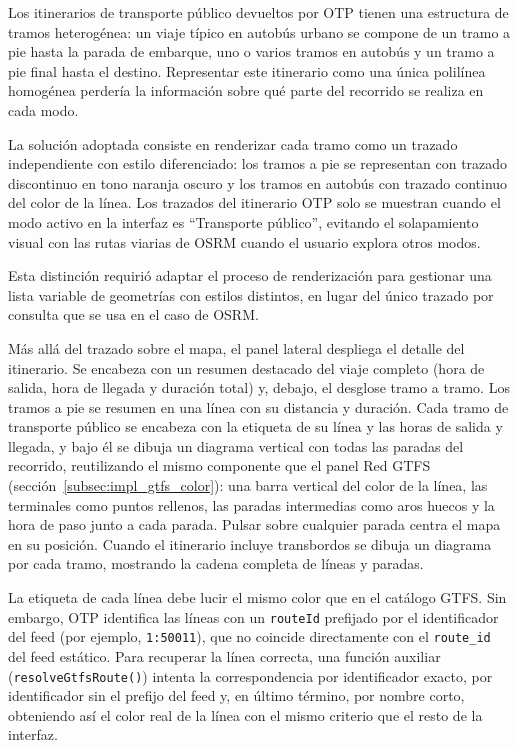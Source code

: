 Los itinerarios de transporte público devueltos por OTP tienen una estructura de tramos heterogénea: un viaje típico en autobús urbano se compone de un tramo a pie hasta la parada de embarque, uno o varios tramos en autobús y un tramo a pie final hasta el destino. Representar este itinerario como una única polilínea homogénea perdería la información sobre qué parte del recorrido se realiza en cada modo.

La solución adoptada consiste en renderizar cada tramo como un trazado independiente con estilo diferenciado: los tramos a pie se representan con trazado discontinuo en tono naranja oscuro y los tramos en autobús con trazado continuo del color de la línea. Los trazados del itinerario OTP solo se muestran cuando el modo activo en la interfaz es ``Transporte público'', evitando el solapamiento visual con las rutas viarias de OSRM cuando el usuario explora otros modos.

Esta distinción requirió adaptar el proceso de renderización para gestionar una lista variable de geometrías con estilos distintos, en lugar del único trazado por consulta que se usa en el caso de OSRM.

Más allá del trazado sobre el mapa, el panel lateral despliega el detalle del itinerario. Se encabeza con un resumen destacado del viaje completo (hora de salida, hora de llegada y duración total) y, debajo, el desglose tramo a tramo. Los tramos a pie se resumen en una línea con su distancia y duración. Cada tramo de transporte público se encabeza con la etiqueta de su línea y las horas de salida y llegada, y bajo él se dibuja un diagrama vertical con todas las paradas del recorrido, reutilizando el mismo componente que el panel Red GTFS (sección~\ref{subsec:impl_gtfs_color}): una barra vertical del color de la línea, las terminales como puntos rellenos, las paradas intermedias como aros huecos y la hora de paso junto a cada parada. Pulsar sobre cualquier parada centra el mapa en su posición. Cuando el itinerario incluye transbordos se dibuja un diagrama por cada tramo, mostrando la cadena completa de líneas y paradas.

La etiqueta de cada línea debe lucir el mismo color que en el catálogo GTFS. Sin embargo, OTP identifica las líneas con un \texttt{routeId} prefijado por el identificador del feed (por ejemplo, \texttt{1:50011}), que no coincide directamente con el \texttt{route\_id} del feed estático. Para recuperar la línea correcta, una función auxiliar (\texttt{resolveGtfsRoute()}) intenta la correspondencia por identificador exacto, por identificador sin el prefijo del feed y, en último término, por nombre corto, obteniendo así el color real de la línea con el mismo criterio que el resto de la interfaz.


